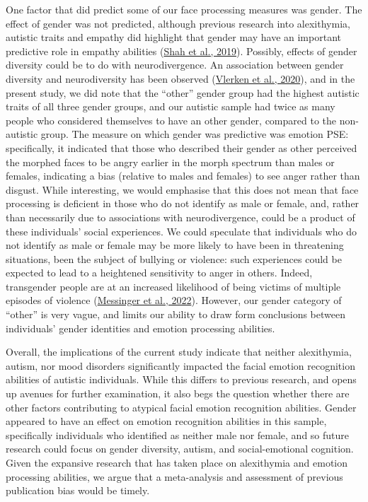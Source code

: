 \documentclass[
]{article}
\begin{document}
One factor that did predict some of our face processing measures was gender. The effect of gender was not predicted, although previous research into alexithymia, autistic traits and empathy did highlight that gender may have an important predictive role in empathy abilities (\protect\hyperlink{ref-shah2019a}{Shah et al., 2019}). Possibly, effects of gender diversity could be to do with neurodivergence. An association between gender diversity and neurodiversity has been observed (\protect\hyperlink{ref-vlerken2020a}{Vlerken et al., 2020}), and in the present study, we did note that the ``other'' gender group had the highest autistic traits of all three gender groups, and our autistic sample had twice as many people who considered themselves to have an other gender, compared to the non-autistic group. The measure on which gender was predictive was emotion PSE: specifically, it indicated that those who described their gender as other perceived the morphed faces to be angry earlier in the morph spectrum than males or females, indicating a bias (relative to males and females) to see anger rather than disgust. While interesting, we would emphasise that this does not mean that face processing is deficient in those who do not identify as male or female, and, rather than necessarily due to associations with neurodivergence, could be a product of these individuals' social experiences. We could speculate that individuals who do not identify as male or female may be more likely to have been in threatening situations, been the subject of bullying or violence: such experiences could be expected to lead to a heightened sensitivity to anger in others. Indeed, transgender people are at an increased likelihood of being victims of multiple episodes of violence (\protect\hyperlink{ref-messinger2022a}{Messinger et al., 2022}). However, our gender category of ``other'' is very vague, and limits our ability to draw form conclusions between individuals' gender identities and emotion processing abilities.

Overall, the implications of the current study indicate that neither alexithymia, autism, nor mood disorders significantly impacted the facial emotion recognition abilities of autistic individuals. While this differs to previous research, and opens up avenues for further examination, it also begs the question whether there are other factors contributing to atypical facial emotion recognition abilities. Gender appeared to have an effect on emotion recognition abilities in this sample, specifically individuals who identified as neither male nor female, and so future research could focus on gender diversity, autism, and social-emotional cognition. Given the expansive research that has taken place on alexithymia and emotion processing abilities, we argue that a meta-analysis and assessment of previous publication bias would be timely.
\end{document}
